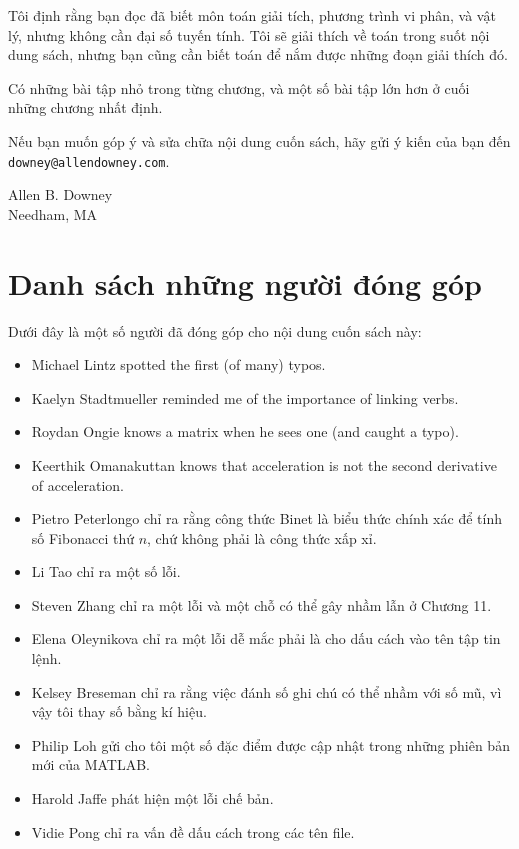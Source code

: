 \documentclass[12pt]{book}
\begin{document}
Tôi định rằng bạn đọc đã biết môn toán giải tích, phương trình vi phân,
và vật lý, nhưng không cần đại số tuyến tính. Tôi sẽ giải thích về toán
trong suốt nội dung sách, nhưng bạn cũng cần biết toán để nắm được
những đoạn giải thích đó.

Có những bài tập nhỏ trong từng chương, và một số bài tập lớn hơn
ở cuối những chương nhất định.

Nếu bạn muốn góp ý và sửa chữa nội dung cuốn sách, hãy gửi ý kiến
của bạn đến 
{\tt downey@allendowney.com}.

\noindent Allen B. Downey \\
\noindent Needham, MA \\

\vspace{0.1in}

\section*{Danh sách những người đóng góp}

Dưới đây là một số người đã đóng góp cho nội dung cuốn sách này:


\begin{itemize}

\item Michael Lintz spotted the first (of many) typos.

\item Kaelyn Stadtmueller reminded me of the importance of linking
verbs.

\item Roydan Ongie knows a matrix when he sees one (and caught a typo).

\item Keerthik Omanakuttan knows that acceleration is not the
second derivative of acceleration.

\item Pietro Peterlongo chỉ ra rằng công thức Binet là biểu thức
chính xác để tính số Fibonacci thứ $n$, chứ không phải là công thức xấp xỉ.

\item Li Tao chỉ ra một số lỗi.

\item Steven Zhang chỉ ra một lỗi và một chỗ có thể gây nhầm lẫn ở Chương 11.

\item Elena Oleynikova chỉ ra một lỗi dễ mắc phải là cho dấu cách vào
tên tập tin lệnh.

\item Kelsey Breseman chỉ ra rằng việc đánh số ghi chú có thể nhầm với số mũ,
vì vậy tôi thay số bằng kí hiệu.

\item Philip Loh gửi cho tôi một số đặc điểm được cập nhật trong những phiên bản mới của MATLAB.

\item Harold Jaffe phát hiện một lỗi chế bản.

\item Vidie Pong chỉ ra vấn đề dấu cách trong các tên file.

\end{itemize}
\end{document}
